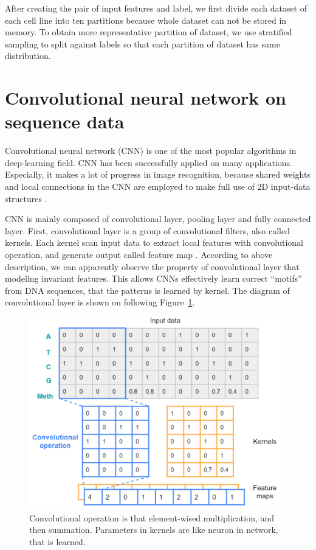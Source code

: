 After creating the pair of input features and label, we first divide each dataset of each cell line into ten partitions because whole dataset can not be stored in memory. To obtain more representative partition of dataset, we use stratified sampling to split against labels so that each partition of dataset has same distribution.

\section{Convolutional neural network on sequence data}
Convolutional neural network (CNN) is one of the most popular algorithms in deep-learning field. CNN has been successfully applied on many applications. Especially, it makes a lot of progress in image recognition, because shared weights and local connections in the CNN are employed to make full use of 2D input-data structures \cite{alzubaidi2021review}.

CNN is mainly composed of convolutional layer, pooling layer and fully connected layer. First, convolutional layer is a group of convolutional filters, also called kernels. Each kernel scan input data to extract local features with convolutional operation, and generate output called feature map \cite{alzubaidi2021review}. According to above description, we can apparently observe the property of convolutional layer that modeling invariant features. This allows CNNs effectively learn correct “motifs” from DNA sequences, that the patterns is learned by kernel. The diagram of convolutional layer is shown on following Figure~\ref{f4}.

\begin{figure}[H]
    \centering
    \includegraphics[width=1\columnwidth]{body/figure/figure4.png}
    \captionsetup{labelfont=bf}
    \renewcommand{\baselinestretch}{1.0}
    \caption[Convolutional operation]{Convolutional operation is that element-wised multiplication, and then summation. Parameters in kernels are like neuron in network, that is learned.}
    \label{f4}
\end{figure}

